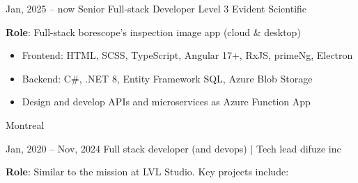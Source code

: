 \documentclass[
  a4paper,
   maincolor=cvblue,
   sectioncolor=cvblue,
   sidebarwidth=0.323\paperwidth,
]{fortysecondscv}
\begin{document}
\newpage
\restoregeometry
{}\paperwidth

\makefrontsidebar

\vspace*{-3.7em} %



\begin{cvtableNew}


  \cvitemRightNew
    {Jan, 2025 – now} %
    {Senior Full-stack Developer Level 3} %
    {Evident Scientific} %
    {
      \vspace{0.1pt} %
      \fontsize{10.8pt}{12pt}\selectfont %
      \textbf{Role}: Full-stack borescope's inspection image app (cloud \& desktop)\vspace{4pt}
      \begin{itemize}[itemsep=-1mm, topsep=0pt, leftmargin=8pt]
        \item Frontend: HTML, SCSS, TypeScript, Angular 17+, RxJS, primeNg, Electron\vspace{5pt}
        \item Backend: C\#, .NET 8, Entity Framework SQL, Azure Blob Storage\vspace{5pt}
        \item Design and develop APIs and microservices as Azure Function App\vspace{5pt}
      \end{itemize}
    }
    {Montreal} %

    \vspace{1.6mm} %


  \cvitemRightNew
      {Jan, 2020 – Nov, 2024} %
      {Full stack developer (and devops) | Tech lead} %
      {difuze inc} %
      {
        \vspace{0.1pt} %
        \fontsize{10.8pt}{12pt}\selectfont %
        \textbf{Role}: Similar to the mission at LVL Studio. Key projects include:\vspace{5pt}

}
\end{cvtableNew}
\end{document}
